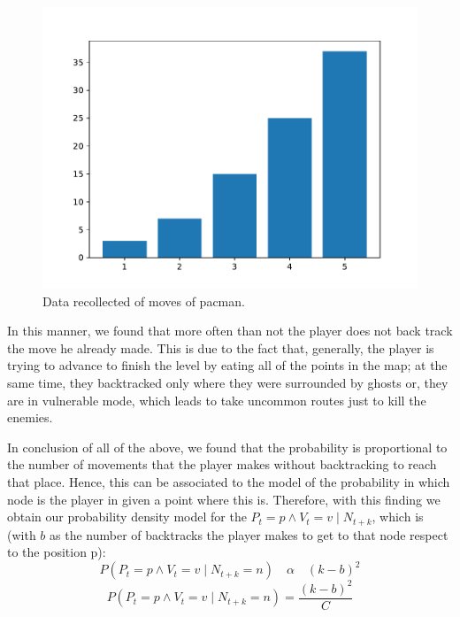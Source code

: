	  \begin{figure}[H]
          \centering
          \includegraphics[scale=0.5]{files/Figure_1.pdf}
          \caption{Data recollected of moves of pacman.}
          \label{img:data}
      \end{figure}
      
In this manner, we found that more often than not the player does not back track the move he already made. This is due to the fact that, generally, the player is trying to advance to finish the level by eating all of the points in the map; at the same time, they backtracked only where they were surrounded by ghosts or, they are in vulnerable mode, which leads to take uncommon routes just to kill the enemies.

In conclusion of all of the above, we found that the probability is proportional to the number of movements that the player makes without backtracking to reach that place. Hence, this can be associated to the model of the probability in which node is the player in given a point where this is. Therefore, with this finding we obtain our probability density model for the ${ P }_{ t }=p\wedge { V }_{ t}=v\mid{ N }_{ t+k }$, which is (with $b$ as the number of backtracks the player makes to get to that node respect to the position p):
	\begin{equation*}
      P({ P }_{ t }=p\wedge { V }_{ t}=v\mid{ N }_{ t+k }=n) \quad \alpha \quad (k - b)^2
  \end{equation*}
  \begin{equation*}
      P({ P }_{ t }=p\wedge { V }_{ t}=v\mid{ N }_{ t+k }=n) = \frac {(k - b)^2}{C}
  \end{equation*}

